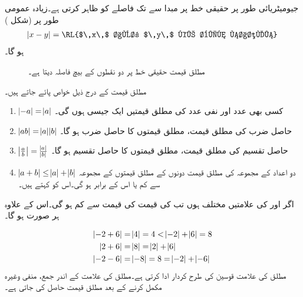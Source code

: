 جیومیٹریائی طور پر حقیقی خط پر مبدا  سے  تک فاصلے کو  ظاہر کرتی ہے۔زیادہ عمومی طور پر (شکل ) 
\begin{align*}
\abs{x-y}=\text{\RL{$\,x\,$ اور $\,y\,$ کے بیچ فاصلہ}}
\end{align*}
ہو گا۔
\begin{figure}
\centering
{}
\caption{مطلق قیمت حقیقی خط پر دو نقطوں کے بیچ فاصلہ دیتا ہے۔}
\label{شکل_ابتدائی_مطلق_جیومیٹریائی_مطلب}
\end{figure}
مطلق قیمت کے درج ذیل خواص پائے جاتے ہیں۔
\begin{mdframed}[frametitle={مطلق قیمت کے خواص}]
\begin{enumerate}[1.]
\item{$\abs{-a}=\abs{a}$}\quad
کسی بھی عدد اور نفی عدد  کی مطلق قیمتیں ایک جیسی ہوں گی۔
\item{$\abs{ab}=\abs{a}\abs{b}$}\quad
حاصل ضرب کی مطلق قیمت، مطلق قیمتوں کا حاصل ضرب ہو گا۔
\item{$\abs{\frac{a}{b}}=\frac{\abs{a}}{\abs{b}}$}\quad
حاصل تقسیم کی مطلق قیمت، مطلق قیمتوں کا حاصل تقسیم ہو گا۔
\item{$\abs{a+b}\le \abs{a}+\abs{b}$}\quad
دو اعداد کے مجموعہ کی مطلق قیمت دونوں کے مطلق قیمتوں کے مجموعہ سے کم یا اس کے برابر ہو گی۔اس کو  کہتے ہیں۔
\end{enumerate}
\end{mdframed}

اگر  اور  کی علامتیں مختلف ہوں تب  کی قیمت  کی قیمت سے کم ہو گی۔اس کے علاوہ ہر صورت  ہو گا۔

\begin{align*}
\abs{-2+6}&=\abs{4}=4<\abs{-2}+\abs{6}=8\\
\abs{2+6}&=\abs{8}=\abs{2}+\abs{6}\\
\abs{-2-6}&=\abs{-8}=8=\abs{-2}+\abs{-6}
\end{align*}
مطلق کی علامت قوسین کی طرح کردار ادا کرتی ہے۔مطلق کی علامت کے اندر جمع، منفی وغیرہ مکمل کرنے کے بعد مطلق قیمت حاصل کی جاتی ہے۔

